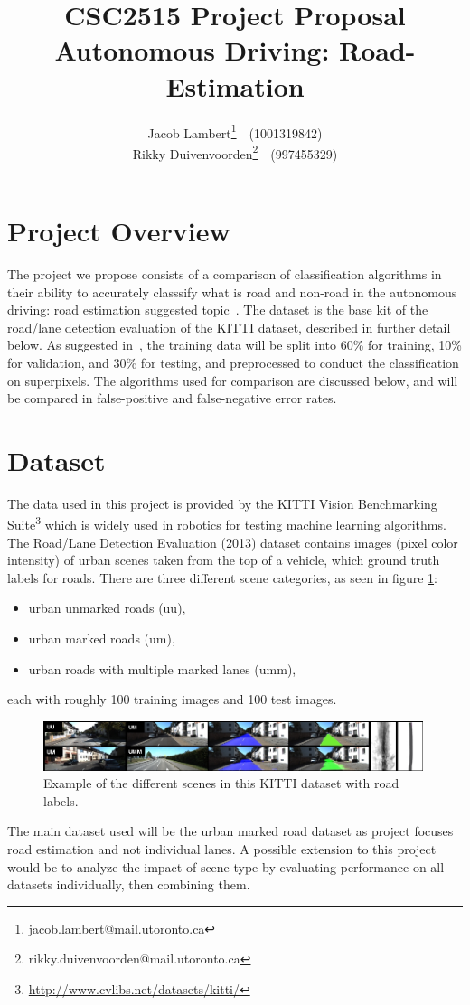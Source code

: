 \documentclass[a4paper,10pt]{article}
\title{\textbf{CSC2515 Project Proposal} \\
Autonomous Driving: Road-Estimation}
\author{
  Jacob Lambert\footnote{jacob.lambert@mail.utoronto.ca}~~(1001319842)\\
  Rikky Duivenvoorden\footnote{rikky.duivenvoorden@mail.utoronto.ca}~~(997455329) \\
}
\date{}
\begin{document}
\maketitle

\section{Project Overview}
The project we propose consists of a comparison of classification algorithms in their ability to accurately classsify what is road and non-road in the autonomous driving: road estimation suggested topic~\cite{csc2515_suggestedprojects}. The dataset is the base kit of the road/lane detection evaluation of the KITTI dataset, described in further detail below. As suggested in~\cite{csc2515_suggestedprojects}, the training data will be split into 60\% for training, 10\% for validation, and 30\% for testing, and preprocessed to conduct the classification on superpixels. The algorithms used for comparison are discussed below, and will be compared in false-positive and false-negative error rates.


\section{Dataset}
The data used in this project is provided by the KITTI Vision Benchmarking Suite\footnote{ \url{http://www.cvlibs.net/datasets/kitti/}} which is widely used in robotics for testing machine learning algorithms. The Road/Lane Detection Evaluation (2013) dataset contains images (pixel color intensity) of urban scenes taken from the top of a vehicle, which ground truth labels for roads. There are three different scene categories, as seen in figure \ref{fig:kitti}:
\begin{itemize}
 \item urban unmarked roads (uu),
 \item urban marked roads (um),
 \item urban roads with multiple marked lanes (umm),
\end{itemize}
each with roughly 100 training images and 100 test images.
\begin{figure}[ht!]
 \centering
 \includegraphics[width=0.99\textwidth]{figs/kitti.jpg}
 \caption{Example of the different scenes in this KITTI dataset with road labels.}\label{fig:kitti}
\end{figure}
The main dataset used will be the urban marked road dataset as project focuses road estimation and not individual lanes. A possible extension to this project would be to analyze the impact of scene type by evaluating performance on all datasets individually, then combining them.
\end{document}

